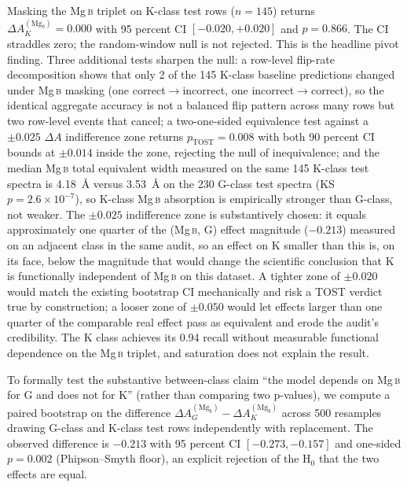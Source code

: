 \documentclass[11pt,a4paper]{article}
\newcommand{\Mgb}{Mg\,\textsc{b}\xspace}
\newcommand{\dA}{\Delta A}
\begin{document}
Masking the \Mgb triplet on K-class test rows ($n = 145$) returns $\dA_K^{(\mathrm{Mg}_b)} = 0.000$ with 95 percent CI $[-0.020, +0.020]$ and $p = 0.866$. The CI straddles zero; the random-window null is not rejected. This is the headline pivot finding. Three additional tests sharpen the null: a row-level flip-rate decomposition shows that only 2 of the 145 K-class baseline predictions changed under \Mgb masking (one correct$\to$incorrect, one incorrect$\to$correct), so the identical aggregate accuracy is not a balanced flip pattern across many rows but two row-level events that cancel; a two-one-sided equivalence test against a $\pm 0.025$ $\dA$ indifference zone returns $p_{\mathrm{TOST}} = 0.008$ with both 90 percent CI bounds at $\pm 0.014$ inside the zone, rejecting the null of inequivalence; and the median \Mgb total equivalent width measured on the same 145 K-class test spectra is 4.18~\AA{} versus 3.53~\AA{} on the 230 G-class test spectra (KS $p = 2.6 \times 10^{-7}$), so K-class \Mgb absorption is empirically stronger than G-class, not weaker. The $\pm 0.025$ indifference zone is substantively chosen: it equals approximately one quarter of the (\Mgb, G) effect magnitude ($-0.213$) measured on an adjacent class in the same audit, so an effect on K smaller than this is, on its face, below the magnitude that would change the scientific conclusion that K is functionally independent of \Mgb on this dataset. A tighter zone of $\pm 0.020$ would match the existing bootstrap CI mechanically and risk a TOST verdict true by construction; a looser zone of $\pm 0.050$ would let effects larger than one quarter of the comparable real effect pass as equivalent and erode the audit's credibility. The K class achieves its 0.94 recall without measurable functional dependence on the \Mgb triplet, and saturation does not explain the result.

To formally test the substantive between-class claim ``the model depends on \Mgb for G and does not for K'' (rather than comparing two p-values), we compute a paired bootstrap on the difference $\dA_G^{(\mathrm{Mg}_b)} - \dA_K^{(\mathrm{Mg}_b)}$ across 500 resamples drawing G-class and K-class test rows independently with replacement. The observed difference is $-0.213$ with 95 percent CI $[-0.273, -0.157]$ and one-sided $p = 0.002$ (Phipson--Smyth floor), an explicit rejection of the H$_0$ that the two effects are equal.
\end{document}
